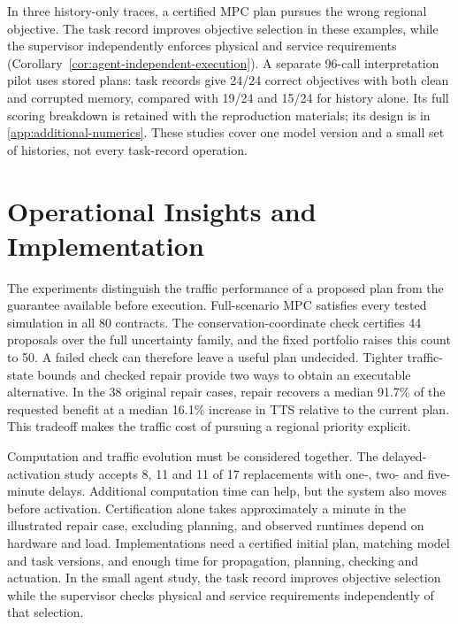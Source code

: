 \documentclass[preprint,12pt]{elsarticle}
\theoremstyle{definition}
\theoremstyle{plain}
\theoremstyle{definition}
\theoremstyle{plain}
\newcommand{\appref}[1]{\ref{#1}}
\begin{document}
In three history-only traces, a certified MPC plan pursues the wrong
regional objective. The task record improves objective selection in
these examples, while the supervisor independently enforces physical
and service requirements (Corollary~\ref{cor:agent-independent-execution}).
A separate 96-call interpretation pilot uses stored plans: task records
give 24/24 correct objectives with both clean and corrupted memory,
compared with 19/24 and 15/24 for history alone. Its full scoring breakdown
is retained with the reproduction materials; its design is in
\appref{app:additional-numerics}. These studies cover one model version
and a small set of histories, not every task-record operation.

\section{Operational Insights and Implementation}
\label{sec:new-discussion}
\label{sec:information-model-scope}

The experiments distinguish the traffic performance of a proposed plan
from the guarantee available before execution. Full-scenario MPC satisfies
every tested simulation in all 80 contracts. The conservation-coordinate
check certifies 44 proposals over the full uncertainty family, and the
fixed portfolio raises this count to 50. A failed check can
therefore leave a useful plan undecided. Tighter traffic-state bounds and
checked repair provide two ways to obtain an executable alternative.
In the 38 original repair cases, repair recovers a median 91.7\% of the
requested benefit at a median 16.1\% increase in TTS relative to the
current plan. This tradeoff makes the traffic cost of pursuing a regional
priority explicit.

Computation and traffic evolution must be considered together. The
delayed-activation study accepts 8, 11 and 11 of 17 replacements with
one-, two- and five-minute delays. Additional computation time can help,
but the system also moves before activation. Certification alone takes
approximately a minute in the illustrated repair case, excluding planning,
and observed runtimes depend on hardware and load. Implementations need a
certified initial plan, matching model and task versions, and enough time
for propagation, planning, checking and actuation. In the small agent
study, the task record improves objective selection while the supervisor
checks physical and service requirements independently of that selection.
\end{document}
